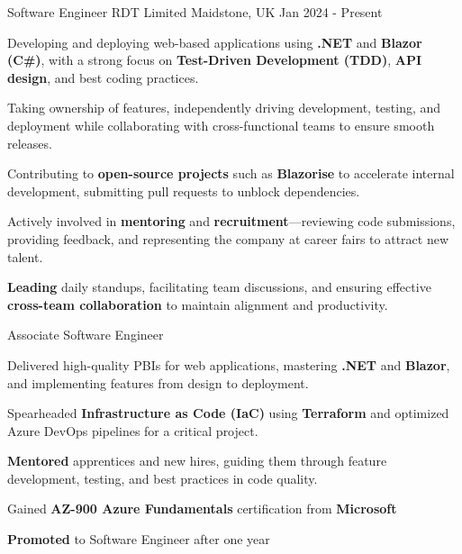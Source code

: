 \begin{cventries}
    \cventry
    {Software Engineer} %
    {RDT Limited} %
    {Maidstone, UK} %
    {Jan 2024 - Present} %
    {
      \begin{cvitems}
        \item {Developing and deploying web-based applications using \textbf{.NET} and \textbf{Blazor} \textbf{(C\#)}, with a strong focus on \textbf{Test-Driven Development (TDD)}, \textbf{API design}, and best coding practices.}
        \item {Taking ownership of features, independently driving development, testing, and deployment while collaborating with cross-functional teams to ensure smooth releases.}
        \item {Contributing to \textbf{open-source projects} such as \textbf{Blazorise} to accelerate internal development, submitting pull requests to unblock dependencies.}
        \item {Actively involved in \textbf{mentoring} and \textbf{recruitment}—reviewing code submissions, providing feedback, and representing the company at career fairs to attract new talent.}
        \item {\textbf{Leading} daily standups, facilitating team discussions, and ensuring effective \textbf{cross-team collaboration} to maintain alignment and productivity.}
      \end{cvitems}
    }
    \cventry
    {Associate Software Engineer} %
    {} %
    {} %
    {} %
    {
      \begin{cvitems}
        \item {Delivered high-quality PBIs for web applications, mastering \textbf{.NET} and \textbf{Blazor}, and implementing features from design to deployment.}
        \item {Spearheaded \textbf{Infrastructure as Code (IaC)} using \textbf{Terraform} and optimized Azure DevOps pipelines for a critical project.}
        \item {\textbf{Mentored} apprentices and new hires, guiding them through feature development, testing, and best practices in code quality.}
        \item {Gained \textbf{AZ-900 Azure Fundamentals} certification from \textbf{Microsoft}}
        \item {\textbf{Promoted} to Software Engineer after one year}
      \end{cvitems}
    }

\end{cventries}
